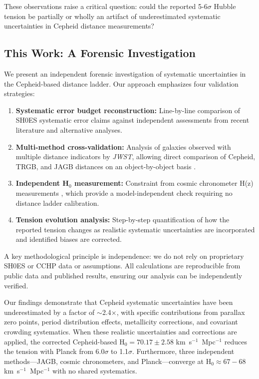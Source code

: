 \documentclass[twocolumn, linenumbers]{aastex701}
\begin{document}
These observations raise a critical question: could the reported 5-6$\sigma$ Hubble tension be partially or wholly an artifact of underestimated systematic uncertainties in Cepheid distance measurements?

\subsection{This Work: A Forensic Investigation}

We present an independent forensic investigation of systematic uncertainties in the Cepheid-based distance ladder. Our approach emphasizes four validation strategies:

\begin{enumerate}
\item \textbf{Systematic error budget reconstruction:} Line-by-line comparison of SH0ES systematic error claims against independent assessments from recent literature and alternative analyses.

\item \textbf{Multi-method cross-validation:} Analysis of galaxies observed with multiple distance indicators by \textit{JWST}, allowing direct comparison of Cepheid, TRGB, and JAGB distances on an object-by-object basis \citep{Freedman2024}.

\item \textbf{Independent H$_0$ measurement:} Constraint from cosmic chronometer H(z) measurements \citep{Moresco2022}, which provide a model-independent check requiring no distance ladder calibration.

\item \textbf{Tension evolution analysis:} Step-by-step quantification of how the reported tension changes as realistic systematic uncertainties are incorporated and identified biases are corrected.
\end{enumerate}

A key methodological principle is independence: we do not rely on proprietary SH0ES or CCHP data or assumptions. All calculations are reproducible from public data and published results, ensuring our analysis can be independently verified.

Our findings demonstrate that Cepheid systematic uncertainties have been underestimated by a factor of $\sim$2.4$\times$, with specific contributions from parallax zero points, period distribution effects, metallicity corrections, and covariant crowding systematics. When these realistic uncertainties and corrections are applied, the corrected Cepheid-based H$_0 = 70.17 \pm 2.58$ km~s$^{-1}$~Mpc$^{-1}$ reduces the tension with Planck from 6.0$\sigma$ to 1.1$\sigma$. Furthermore, three independent methods---JAGB, cosmic chronometers, and Planck---converge at H$_0 \approx 67-68$ km~s$^{-1}$~Mpc$^{-1}$ with no shared systematics.
\end{document}
